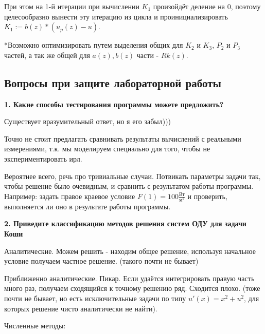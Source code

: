 \documentclass[a4paper,12pt]{article}
\begin{document}
    При этом на 1-й итерации при вычислении $K_{1}$ произойдёт деление на 0, поэтому целесообразно
    вынести эту итерацию из цикла и проинициализировать $K_{1}:=b(z) * (u_p(z)-u)$.

    \vspace{2cm}
    *Возможно оптимизировать путем выделения общих для $K_2$ и $K_3$, $P_2$ и $P_3$ частей, а так же
    общей для $a(z), b(z)$ части - $Rk(z)$.

    \newpage
    \subsection*{Вопросы при защите лабораторной работы}

    \textbf{1. Какие способы тестирования программы можете предложить?}

    \color{red}

    Существует вразумительный ответ, но я его забыл))) 

    Точно не стоит предлагать сравнивать результаты вычислений с реальными измерениями, 
    т.к. мы моделируем специально для того, чтобы не экспериментировать ирл.

    Вероятнее всего, речь про тривиальные случаи. Потвикать параметры задачи так, 
    чтобы решение было очевидным, и сравнить с результатом работы программы. 
    Например: задать правое краевое условие $F(1)=100\frac{\text{Вт}}{\text{м}^2}$ и проверить, выполняется ли 
    оно в результате работы программы.

    \color{black}

    \vspace{1cm}
    \textbf{2. Приведите классификацию методов решения систем ОДУ для задачи Коши}

    Аналитические. Можем решить - находим общее решение, используя начальное условие получаем
    частное решение. (такого почти не бывает)

    Приближенно аналитические. Пикар. Если удаётся интегрировать правую часть много раз, 
    получаем сходящийся к точному решению ряд. Сходится плохо. (тоже почти не бывает, но есть
    исключительные задачи по типу $u'(x)=x^2+u^2$, для которых решение чисто аналитически не найти).

    Численные методы: 
    
\end{document}
